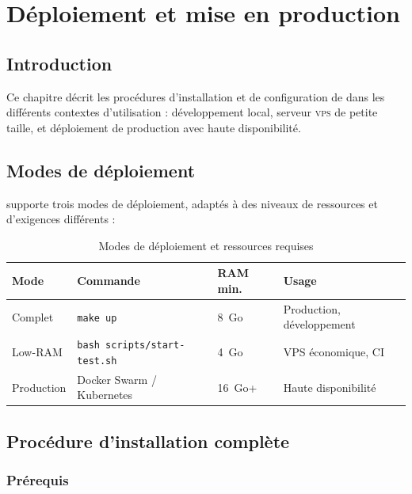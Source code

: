 \chapter{Déploiement et mise en production}

\section*{Introduction}

Ce chapitre décrit les procédures d'installation et de configuration de
\caimp{} dans les différents contextes d'utilisation : développement local,
serveur \textsc{vps} de petite taille, et déploiement de production avec
haute disponibilité.

\section{Modes de déploiement}

\caimp{} supporte trois modes de déploiement, adaptés à des niveaux de ressources
et d'exigences différents :

\begin{table}[H]
\centering
\caption{Modes de déploiement et ressources requises}
\label{tab:deploy-modes}
\begin{tabularx}{\textwidth}{lXXX}
\toprule
\textbf{Mode} & \textbf{Commande} & \textbf{RAM min.} & \textbf{Usage} \\
\midrule
Complet    & \texttt{make up}                & 8~Go   & Production, développement \\
Low-RAM    & \texttt{bash scripts/start-test.sh} & 4~Go & VPS économique, CI \\
Production & Docker Swarm / Kubernetes       & 16~Go+ & Haute disponibilité \\
\bottomrule
\end{tabularx}
\end{table}

\section{Procédure d'installation complète}

\subsection{Prérequis}

